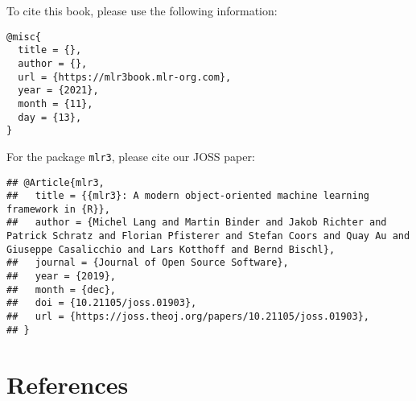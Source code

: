 \documentclass[
]{scrbook}
\begin{document}
To cite this book, please use the following information:

\begin{verbatim}
@misc{
  title = {},
  author = {},
  url = {https://mlr3book.mlr-org.com},
  year = {2021},
  month = {11},
  day = {13},
}
\end{verbatim}

For the package \texttt{mlr3}, please cite our JOSS paper:

\begin{verbatim}
## @Article{mlr3,
##   title = {{mlr3}: A modern object-oriented machine learning framework in {R}},
##   author = {Michel Lang and Martin Binder and Jakob Richter and Patrick Schratz and Florian Pfisterer and Stefan Coors and Quay Au and Giuseppe Casalicchio and Lars Kotthoff and Bernd Bischl},
##   journal = {Journal of Open Source Software},
##   year = {2019},
##   month = {dec},
##   doi = {10.21105/joss.01903},
##   url = {https://joss.theoj.org/papers/10.21105/joss.01903},
## }
\end{verbatim}

\hypertarget{references}{%
\chapter*{References}\label{references}}
\end{document}
